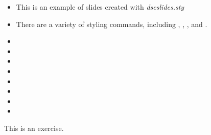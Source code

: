 \documentclass{dscslides}
\begin{document}


\begin{frame}

    \begin{itemize}
        \item This is an example of slides created with \textit{dscslides.sty}
    \end{itemize}

\end{frame}

\begin{frame}

    \begin{itemize}
        \item There are a variety of styling commands, including ,
            , , and .
    \end{itemize}

\end{frame}

\begin{frame}

    \begin{itemize}[nosep]
        \item \color{pastelred}{pastelred}
        \item \color{pastelblue}{pastelblue}
        \item \color{pastelpurple}{pastelpurple}
        \item \color{pastelyellow}{pastelyellow}
        \item \color{pastelgreen}{pastelgreen}
        \item \color{darkblue}{darkblue}
        \item \color{darkgreen}{darkgreen}
        \item \color{faded}{faded}
    \end{itemize}

\end{frame}

\begin{frame}

    \begin{exercise}
        This is an exercise.
    \end{exercise}

\end{frame}
\end{document}

